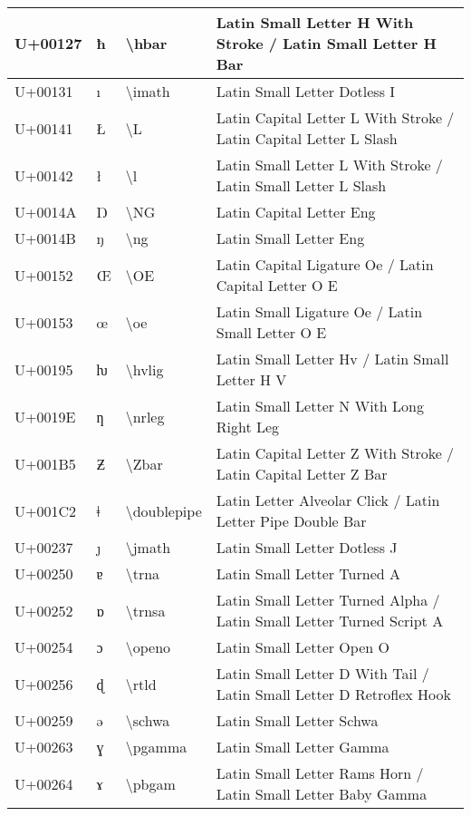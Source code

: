 \begin{table}[h]
\begin{tabulary}{\linewidth}{|L|L|L|L|}
\hline
U+00127 & ħ & {\textbackslash}hbar & Latin Small Letter H With Stroke / Latin Small Letter H Bar \\
\hline
U+00131 & ı & {\textbackslash}imath & Latin Small Letter Dotless I \\
\hline
U+00141 & Ł & {\textbackslash}L & Latin Capital Letter L With Stroke / Latin Capital Letter L Slash \\
\hline
U+00142 & ł & {\textbackslash}l & Latin Small Letter L With Stroke / Latin Small Letter L Slash \\
\hline
U+0014A & Ŋ & {\textbackslash}NG & Latin Capital Letter Eng \\
\hline
U+0014B & ŋ & {\textbackslash}ng & Latin Small Letter Eng \\
\hline
U+00152 & Œ & {\textbackslash}OE & Latin Capital Ligature Oe / Latin Capital Letter O E \\
\hline
U+00153 & œ & {\textbackslash}oe & Latin Small Ligature Oe / Latin Small Letter O E \\
\hline
U+00195 & ƕ & {\textbackslash}hvlig & Latin Small Letter Hv / Latin Small Letter H V \\
\hline
U+0019E & ƞ & {\textbackslash}nrleg & Latin Small Letter N With Long Right Leg \\
\hline
U+001B5 & Ƶ & {\textbackslash}Zbar & Latin Capital Letter Z With Stroke / Latin Capital Letter Z Bar \\
\hline
U+001C2 & ǂ & {\textbackslash}doublepipe & Latin Letter Alveolar Click / Latin Letter Pipe Double Bar \\
\hline
U+00237 & ȷ & {\textbackslash}jmath & Latin Small Letter Dotless J \\
\hline
U+00250 & ɐ & {\textbackslash}trna & Latin Small Letter Turned A \\
\hline
U+00252 & ɒ & {\textbackslash}trnsa & Latin Small Letter Turned Alpha / Latin Small Letter Turned Script A \\
\hline
U+00254 & ɔ & {\textbackslash}openo & Latin Small Letter Open O \\
\hline
U+00256 & ɖ & {\textbackslash}rtld & Latin Small Letter D With Tail / Latin Small Letter D Retroflex Hook \\
\hline
U+00259 & ə & {\textbackslash}schwa & Latin Small Letter Schwa \\
\hline
U+00263 & ɣ & {\textbackslash}pgamma & Latin Small Letter Gamma \\
\hline
U+00264 & ɤ & {\textbackslash}pbgam & Latin Small Letter Rams Horn / Latin Small Letter Baby Gamma \\

\end{tabulary}
\end{table}
